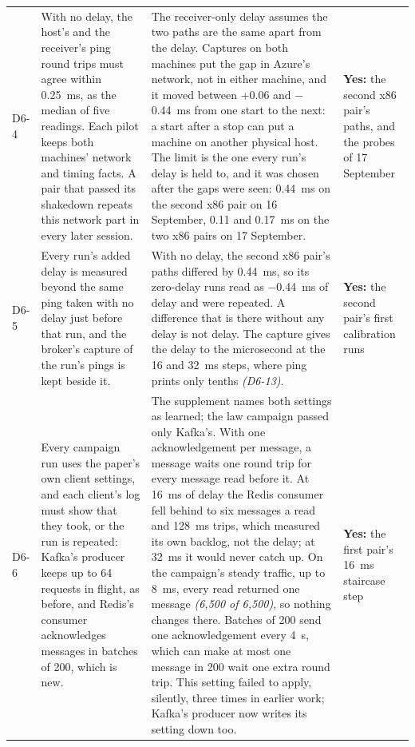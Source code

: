 \documentclass[11pt]{article}
\newcommand{\gl}[1]{{\color{soft}\itshape\small (#1)}}
\begin{document}
{\begin{longtable}{@{}p{1.0cm} >{\raggedright\arraybackslash}p{6.2cm} >{\raggedright\arraybackslash}p{6.0cm} >{\raggedright\arraybackslash}p{2.2cm}@{}}
D6-4 & With no delay, the host's and the receiver's ping round trips must agree within 0.25~ms, as the median of five readings. Each pilot keeps both machines' network and timing facts. A pair that passed its shakedown repeats this network part in every later session. & The receiver-only delay assumes the two paths are the same apart from the delay. Captures on both machines put the gap in Azure's network, not in either machine, and it moved between +0.06 and $-$0.44~ms from one start to the next: a start after a stop can put a machine on another physical host. The limit is the one every run's delay is held to, and it was chosen after the gaps were seen: 0.44~ms on the second x86 pair on 16 September, 0.11 and 0.17~ms on the two x86 pairs on 17 September. & \textbf{Yes:} the second x86 pair's paths, and the probes of 17 September \\
D6-5 & Every run's added delay is measured beyond the same ping taken with no delay just before that run, and the broker's capture of the run's pings is kept beside it. & With no delay, the second x86 pair's paths differed by 0.44~ms, so its zero-delay runs read as $-$0.44~ms of delay and were repeated. A difference that is there without any delay is not delay. The capture gives the delay to the microsecond at the 16 and 32~ms steps, where ping prints only tenths \gl{D6-13}. & \textbf{Yes:} the second pair's first calibration runs \\
D6-6 & Every campaign run uses the paper's own client settings, and each client's log must show that they took, or the run is repeated: Kafka's producer keeps up to 64 requests in flight, as before, and Redis's consumer acknowledges messages in batches of 200, which is new. & The supplement names both settings as learned; the law campaign passed only Kafka's. With one acknowledgement per message, a message waits one round trip for every message read before it. At 16~ms of delay the Redis consumer fell behind to six messages a read and 128~ms trips, which measured its own backlog, not the delay; at 32~ms it would never catch up. On the campaign's steady traffic, up to 8~ms, every read returned one message \gl{6,500 of 6,500}, so nothing changes there. Batches of 200 send one acknowledgement every 4~s, which can make at most one message in 200 wait one extra round trip. This setting failed to apply, silently, three times in earlier work; Kafka's producer now writes its setting down too. & \textbf{Yes:} the first pair's 16~ms staircase step \\

\end{longtable}}
\end{document}
